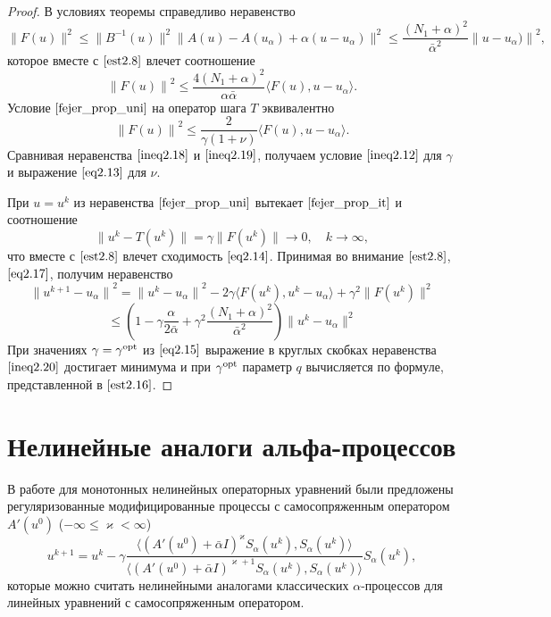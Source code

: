 \begin{proof}
В условиях теоремы справедливо неравенство
\begin{equation}\label{eq2.17}
\|F(u)\|^2\le\|B^{-1}(u)\|^2\|A(u)-A(u_\alpha)+\alpha(u-u_\alpha)\|^2 \le \frac{(N_1+\alpha)^2}{\bar\alpha^2}{\|u-u_\alpha)\|}^2,
\end{equation}
которое вместе с $\eqref{est2.8}$ влечет соотношение
\begin{equation}\label{ineq2.18}
{\|F(u)\|}^2 \le \frac{4(N_1+\alpha)^2}{\alpha\bar\alpha}\langle F(u), u-u_\alpha\rangle.
\end{equation}
Условие $\eqref{fejer_prop_uni}$ на оператор шага $T$ эквивалентно 
\begin{equation}\label{ineq2.19}
{\|F(u)\|}^2 \le \frac{2}{\gamma(1+\nu)}\langle F(u), u-u_\alpha\rangle.
\end{equation}
Сравнивая неравенства $\eqref{ineq2.18}$ и $\eqref{ineq2.19}$, получаем условие $\eqref{ineq2.12}$ для $\gamma$ и выражение $\eqref{eq2.13}$ для $\nu$.

При $u=u^k$ из неравенства $\eqref{fejer_prop_uni}$ вытекает $\eqref{fejer_prop_it}$ и соотношение
$$ \|u^k-T(u^k)\|=\gamma\|F(u^k)\|\to 0, \quad k\to\infty,$$ что вместе с $\eqref{est2.8}$ влечет сходимость $\eqref{eq2.14}$.
Принимая во внимание $\eqref{est2.8}$, $\eqref{eq2.17}$, получим неравенство
$$ {\|u^{k+1}-u_\alpha\|}^2={\|u^k-u_\alpha\|}^2-2\gamma\langle F(u^k), u^k-u_\alpha\rangle+{\gamma}^2\|F(u^k)\|^2 $$
\begin{equation}\label{ineq2.20}
\le \left (1-\gamma\frac{\alpha}{2\bar\alpha}+{\gamma}^2\frac{(N_1+\alpha)^2}{{\bar\alpha}^2}\right )\|u^k-u_\alpha\|^2
\end{equation}
При значениях $\gamma=\gamma^{\textnormal{opt}}$ из $\eqref{eq2.15}$ выражение в круглых скобках неравенства $\eqref{ineq2.20}$ достигает минимума и при $\gamma^{\textnormal{opt}}$ параметр $q$ вычисляется по формуле, представленной в $\eqref{est2.16}$.
\end{proof}

\newpage
\section{Нелинейные аналоги альфа-процессов}

В работе \cite{Vasin2016} для монотонных нелинейных операторных уравнений были предложены регуляризованные модифицированные процессы с самосопряженным оператором $A'(u^0)$ ($-\infty \le \varkappa <\infty$)
$$
u^{k+1}=u^k-\gamma\frac{\langle (A'(u^0)+\bar\alpha I)^{\varkappa}S_\alpha(u^k), S_\alpha(u^k)\rangle }{\langle(A'(u^0)+\bar\alpha I)^{\varkappa+1}S_\alpha(u^k), S_\alpha(u^k)\rangle }S_\alpha(u^k),
$$
которые можно считать нелинейными аналогами классических $\alpha$-процессов для линейных уравнений с самосопряженным оператором.

